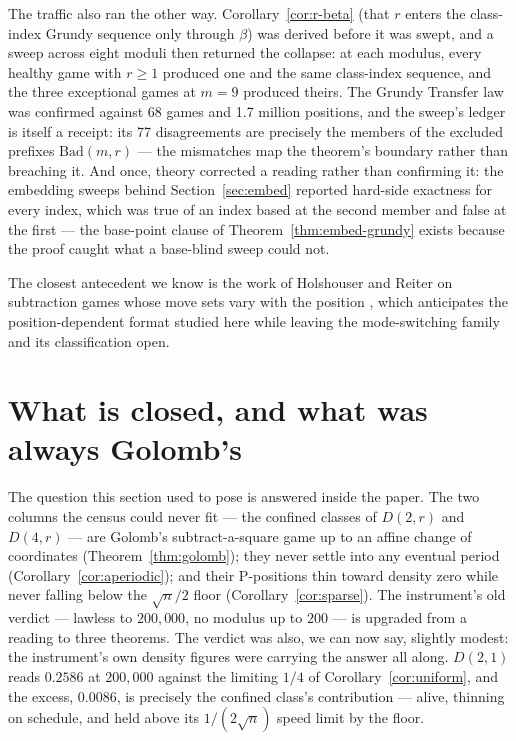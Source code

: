 The traffic also ran the other way. Corollary~\ref{cor:r-beta} (that
$r$ enters the class-index Grundy sequence only through $\beta$) was
derived before it was swept, and a sweep across eight moduli then
returned the collapse: at each modulus, every healthy game with
$r \ge 1$ produced one and the same class-index sequence, and the three
exceptional games at $m = 9$ produced theirs. The Grundy Transfer law was
confirmed against 68 games and 1.7 million positions, and the sweep's
ledger is itself a receipt: its 77 disagreements are precisely the
members of the excluded prefixes $\mathrm{Bad}(m, r)$ --- the mismatches
map the theorem's boundary rather than breaching it. And once, theory
corrected a reading rather than confirming it: the embedding sweeps
behind Section~\ref{sec:embed} reported hard-side exactness for every
index, which was true of an index based at the second member and false at
the first --- the base-point clause of
Theorem~\ref{thm:embed-grundy} exists because the proof caught what a
base-blind sweep could not.

The closest antecedent we know is the work of Holshouser and Reiter on
subtraction games whose move sets vary with the position
\cite{holshouser}, which anticipates the position-dependent format
studied here while leaving the mode-switching family and its
classification open.

\section{What is closed, and what was always Golomb's}\label{sec:open}
The question this section used to pose is answered inside the paper. The
two columns the census could never fit --- the confined classes of
$D(2,r)$ and $D(4,r)$ --- are Golomb's subtract-a-square game up to an
affine change of coordinates (Theorem~\ref{thm:golomb}); they never
settle into any eventual period (Corollary~\ref{cor:aperiodic}); and
their P-positions thin toward density zero while never falling below the
$\sqrt{n}/2$ floor (Corollary~\ref{cor:sparse}). The instrument's old
verdict --- lawless to $200{,}000$, no modulus up to $200$ --- is
upgraded from a reading to three theorems. The verdict was also, we can
now say, slightly modest: the instrument's own density figures were
carrying the answer all along. $D(2,1)$ reads $0.2586$ at $200{,}000$
against the limiting $1/4$ of Corollary~\ref{cor:uniform}, and the
excess, $0.0086$, is precisely the confined class's contribution ---
alive, thinning on schedule, and held above its $1/(2\sqrt{n})$ speed
limit by the floor.


